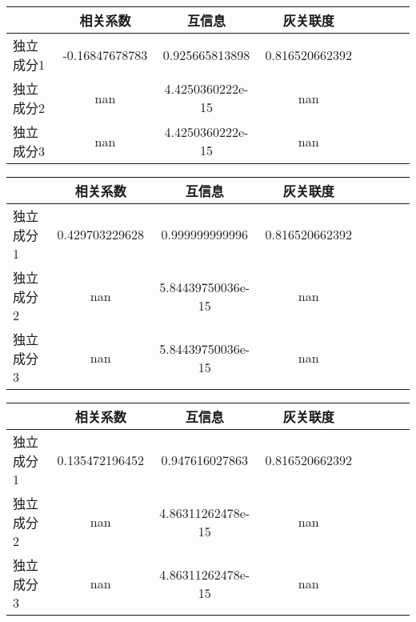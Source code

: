 \begin{table}[!htbp] 
\begin{center}
\begin{tabular}{lccclccc} 
 \toprule 
& 相关系数   & 互信息    &灰关联度 \\ 
\midrule 
独立成分1	& -0.16847678783	& 0.925665813898	& 0.816520662392	\\ 
独立成分2	& nan	& 4.4250360222e-15	& nan	\\ 
独立成分3	& nan	& 4.4250360222e-15	& nan	\\ 
\bottomrule 
 \end{tabular} 
\end{center} 
 \end{table} 


\begin{table}[!htbp] 
\begin{center}
\begin{tabular}{lccclccc} 
 \toprule 
& 相关系数   & 互信息    &灰关联度 \\ 
\midrule 
独立成分1	& 0.429703229628	& 0.999999999996	& 0.816520662392	\\ 
独立成分2	& nan	& 5.84439750036e-15	& nan	\\ 
独立成分3	& nan	& 5.84439750036e-15	& nan	\\ 
\bottomrule 
 \end{tabular} 
\end{center} 
 \end{table} 


\begin{table}[!htbp] 
\begin{center}
\begin{tabular}{lccclccc} 
 \toprule 
& 相关系数   & 互信息    &灰关联度 \\ 
\midrule 
独立成分1	& 0.135472196452	& 0.947616027863	& 0.816520662392	\\ 
独立成分2	& nan	& 4.86311262478e-15	& nan	\\ 
独立成分3	& nan	& 4.86311262478e-15	& nan	\\ 
\bottomrule 
 \end{tabular} 
\end{center} 
 \end{table} 

